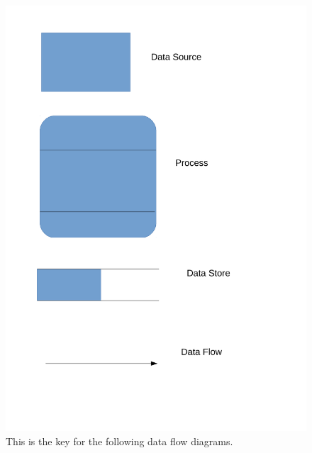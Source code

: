 \begin{figure}[H]
    \includegraphics[width=\textwidth]{./Analysis/images/key.pdf}
    \caption{This is the key for the following data flow diagrams.} \label{fig:data_flow_diagram_key}
\end{figure}


